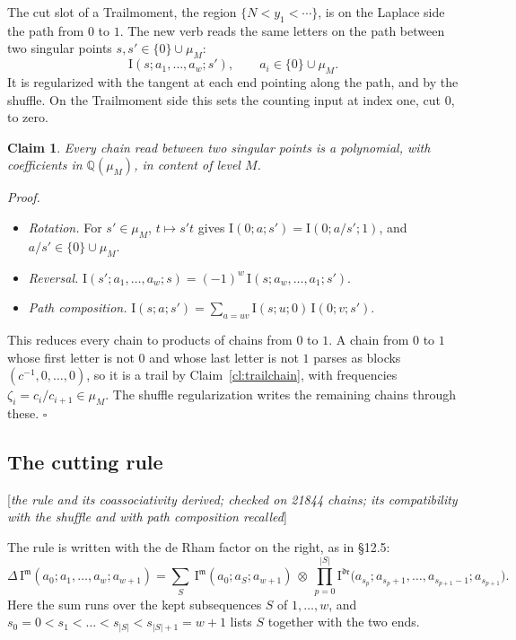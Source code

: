 \documentclass[11pt]{article}
\newcommand{\status}[1]{\hfill{\small[\textit{#1}]}}
\theoremstyle{plain}
\newtheorem{claim}{Claim}[section]
\theoremstyle{remark}
\begin{document}
The cut slot of a Trailmoment, the region $\{N<y_1<\cdots\}$, is on the Laplace side the path from $0$ to $1$. The new verb reads the same letters on the path between two singular points $s,s'\in\{0\}\cup\mu_M$:
\[
\mathrm I(s;a_1,\dots,a_w;s'),\qquad a_i\in\{0\}\cup\mu_M .
\]
It is regularized with the tangent at each end pointing along the path, and by the shuffle. On the Trailmoment side this sets the counting input at index one, cut $0$, to zero.

\begin{claim}\label{cl:betweenclosed}
Every chain read between two singular points is a polynomial, with coefficients in $\mathbb Q(\mu_M)$, in content of level $M$.
\end{claim}

\emph{Proof.}
\begin{itemize}
\item \emph{Rotation.} For $s'\in\mu_M$, $t\mapsto s't$ gives $\mathrm I(0;a;s')=\mathrm I(0;a/s';1)$, and $a/s'\in\{0\}\cup\mu_M$.
\item \emph{Reversal.} $\mathrm I(s';a_1,\dots,a_w;s)=(-1)^w\,\mathrm I(s;a_w,\dots,a_1;s')$.
\item \emph{Path composition.} $\mathrm I(s;a;s')=\sum_{a=uv}\mathrm I(s;u;0)\,\mathrm I(0;v;s')$.
\end{itemize}
This reduces every chain to products of chains from $0$ to $1$. A chain from $0$ to $1$ whose first letter is not $0$ and whose last letter is not $1$ parses as blocks $(c^{-1},0,\dots,0)$, so it is a trail by Claim~\ref{cl:trailchain}, with frequencies $\zeta_i=c_i/c_{i+1}\in\mu_M$. The shuffle regularization writes the remaining chains through these. $\square$

\subsection{The cutting rule}\status{the rule and its coassociativity derived; checked on 21844 chains; its compatibility with the shuffle and with path composition recalled}

The rule is written with the de Rham factor on the right, as in \S12.5:
\[
\Delta\,\mathrm I^{\mathfrak m}(a_0;a_1,\dots,a_w;a_{w+1})=\sum_{S}\ \mathrm I^{\mathfrak m}(a_0;a_S;a_{w+1})\ \otimes\ \prod_{p=0}^{|S|}\mathrm I^{\mathfrak{dr}}\big(a_{s_p};a_{s_p+1},\dots,a_{s_{p+1}-1};a_{s_{p+1}}\big).
\]
Here the sum runs over the kept subsequences $S$ of $1,\dots,w$, and $s_0=0<s_1<\dots<s_{|S|}<s_{|S|+1}=w+1$ lists $S$ together with the two ends.
\end{document}
